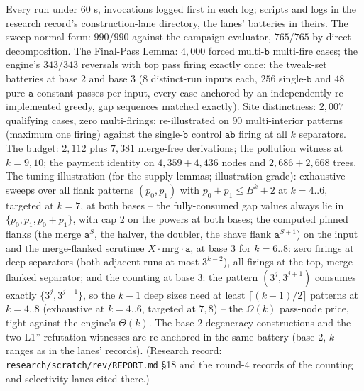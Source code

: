 \begin{remark}
    \label{dich:rem:machine}
    Every run under $60$ s, invocations logged first in each log;
    scripts and logs in the research record's construction-lane
    directory, the lanes' batteries in theirs.  The sweep normal form:
    $990$/$990$ against the campaign evaluator, $765$/$765$ by direct
    decomposition.  The Final-Pass Lemma: $4{,}000$ forced
    multi-$\mathtt b$ multi-fire cases; the engine's $343$/$343$
    reversals with top pass firing exactly once; the tweak-set
    batteries at base 2 and base 3 ($8$ distinct-run inputs each,
    $256$ single-$\mathtt b$ and $48$ pure-$\mathtt a$ constant
    passes per input, every case anchored by an independently
    re-implemented greedy, gap sequences matched exactly).  Site
    distinctness: $2{,}007$ qualifying cases, zero multi-firings;
    re-illustrated on $90$ multi-interior patterns (maximum one
    firing) against the single-$\mathtt b$ control $\mathtt{ab}$
    firing at all $k$ separators.  The budget: $2{,}112$ plus
    $7{,}381$ merge-free derivations; the pollution witness at
    $k = 9, 10$; the payment identity on $4{,}359 + 4{,}436$ nodes
    and $2{,}686 + 2{,}668$ trees.  The tuning illustration (for the
    supply lemmas; illustration-grade): exhaustive sweeps over all
    flank patterns $(p_0, p_1)$ with $p_0 + p_1 \le B^k + 2$ at
    $k = 4..6$, targeted at $k = 7$, at both bases -- the
    fully-consumed gap values always lie in
    $\{p_0, p_1, p_0+p_1\}$, with cap $2$ on the powers at both
    bases; the computed pinned flanks (the merge $\mathtt a^{S}$, the
    halver, the doubler, the shave flank $\mathtt a^{S+1}$) on the
    input and the merge-flanked scrutinee
    $X \cdot \mathrm{mrg} \cdot \mathtt a$, at base 3 for
    $k = 6..8$: zero firings at deep separators (both adjacent runs
    at most $3^{k-2}$), all firings at the top, merge-flanked
    separator; and the counting at base 3: the pattern
    $(3^j, 3^{j+1})$ consumes exactly $\{3^j, 3^{j+1}\}$, so the
    $k - 1$ deep sizes need at least $\lceil (k-1)/2 \rceil$
    patterns at $k = 4..8$ (exhaustive at $k = 4..6$, targeted at
    $7, 8$) -- the $\Omega(k)$ pass-node price, tight against the
    engine's $\Theta(k)$.  The base-2 degeneracy constructions and
    the two L1'' refutation witnesses are re-anchored in the same
    battery (base 2, $k$ ranges as in the lanes' records).
    (Research record: \texttt{research/scratch/rev/REPORT.md} \S 18
    and the round-4 records of the counting and selectivity lanes
    cited there.)
\end{remark}
